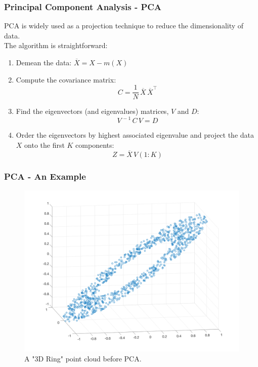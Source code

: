\documentclass{beamer}
\begin{document}
\begin{frame}
	\frametitle{Principal Component Analysis - PCA}
	PCA is widely used as a projection technique to reduce the dimensionality of data. \\ The algorithm is straightforward:
	\begin{enumerate}
		\item Demean the data: $\overline{X} = X - m(X)$
		\item Compute the covariance matrix: \[ C = \frac{1}{N}\,\overline{X}\,\overline{X}^{\top}\]
		\item Find the eigenvectors (and eigenvalues) matrices, $V$ and $D$: \[ V^{\,-1}\,C\,V = D \]
		\item Order the eigenvectors by highest associated eigenvalue and project the data $X$ onto the first $K$ components: \[ Z = \overline{X}\,V(1:K) \]
	\end{enumerate}
\end{frame}

\begin{frame}
\frametitle{PCA - An Example}
	\begin{figure}[hbt]
\includegraphics[width=1\textwidth,height=0.7\textheight,keepaspectratio]{ring_3d}
  	\caption{\footnotesize{A "3D Ring" point cloud before PCA.}}
	\end{figure}
\end{frame}
\end{document}
